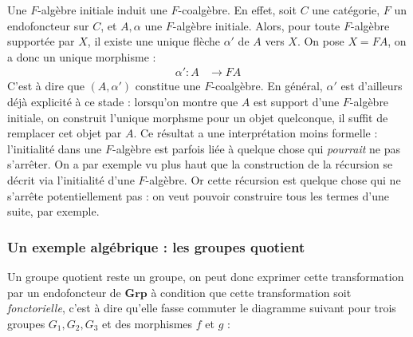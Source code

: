 \documentclass{article}
\begin{document}
Une $F$-algèbre initiale induit une $F$-coalgèbre. En effet, soit $C$ une catégorie, $F$ un endofoncteur sur $C$, et $A, \alpha$ une $F$-algèbre initiale. Alors, pour toute $F$-algèbre supportée par $X$, il existe une unique flèche $ \alpha'$ de $A$ vers $X$. On pose $X = FA$, on a donc un unique morphisme : 
\begin{align*}
    \alpha' : A & \rightarrow FA 
\end{align*}
C'est à dire que $(A, \alpha')$ constitue une $F$-coalgèbre. En général, $\alpha'$ est d'ailleurs déjà explicité à ce stade : lorsqu'on montre que $A$ est support d'une $F$-algèbre initiale, on construit l'unique morphsme pour un objet quelconque, il suffit de remplacer cet objet par $A$.
Ce résultat a une interprétation moins formelle : l'initialité dans une $F$-algèbre est parfois liée à quelque chose qui \textit{pourrait} ne pas s'arrêter. On a par exemple vu plus haut que la construction de la récursion se décrit via l'initialité d'une $F$-algèbre. Or cette récursion est quelque chose qui ne s'arrête potentiellement pas : on veut pouvoir construire tous les termes d'une suite, par exemple. 

\subsubsection{Un exemple algébrique : les groupes quotient}

Un groupe quotient reste un groupe, on peut donc exprimer cette transformation par un endofoncteur de $\mathbf{Grp}$ à condition que cette transformation soit \textit{fonctorielle}, c'est à dire qu'elle fasse commuter le diagramme suivant pour trois groupes $G_1,G_2,G_3$ et des morphismes $f$ et $g$ : 

\begin{center}
\end{center}
\end{document}
